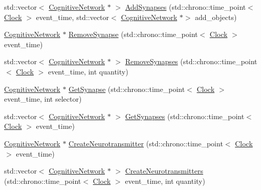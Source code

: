 \begin{DoxyCompactItemize}
\item 
std\+::vector$<$ \mbox{\hyperlink{classCognitiveNetwork}{Cognitive\+Network}} $\ast$ $>$ \mbox{\hyperlink{classCognitiveNetwork_a09d9e01cbd8596af7fac626ce2753643}{Add\+Synapses}} (std\+::chrono\+::time\+\_\+point$<$ \mbox{\hyperlink{universe_8h_a0ef8d951d1ca5ab3cfaf7ab4c7a6fd80}{Clock}} $>$ event\+\_\+time, std\+::vector$<$ \mbox{\hyperlink{classCognitiveNetwork}{Cognitive\+Network}} $\ast$$>$ add\+\_\+objects)
\item 
\mbox{\hyperlink{classCognitiveNetwork}{Cognitive\+Network}} $\ast$ \mbox{\hyperlink{classCognitiveNetwork_a0764ede1c23caa7022a01657a0e3726b}{Remove\+Synapse}} (std\+::chrono\+::time\+\_\+point$<$ \mbox{\hyperlink{universe_8h_a0ef8d951d1ca5ab3cfaf7ab4c7a6fd80}{Clock}} $>$ event\+\_\+time)
\item 
std\+::vector$<$ \mbox{\hyperlink{classCognitiveNetwork}{Cognitive\+Network}} $\ast$ $>$ \mbox{\hyperlink{classCognitiveNetwork_a87d6628f388baed1edb8efda9062c443}{Remove\+Synapses}} (std\+::chrono\+::time\+\_\+point$<$ \mbox{\hyperlink{universe_8h_a0ef8d951d1ca5ab3cfaf7ab4c7a6fd80}{Clock}} $>$ event\+\_\+time, int quantity)
\item 
\mbox{\hyperlink{classCognitiveNetwork}{Cognitive\+Network}} $\ast$ \mbox{\hyperlink{classCognitiveNetwork_a1944aaa13667bc267e6ef44892da969d}{Get\+Synapse}} (std\+::chrono\+::time\+\_\+point$<$ \mbox{\hyperlink{universe_8h_a0ef8d951d1ca5ab3cfaf7ab4c7a6fd80}{Clock}} $>$ event\+\_\+time, int selector)
\item 
std\+::vector$<$ \mbox{\hyperlink{classCognitiveNetwork}{Cognitive\+Network}} $\ast$ $>$ \mbox{\hyperlink{classCognitiveNetwork_aa3376f2e7aed9639c2b5ba27aa6fb314}{Get\+Synapses}} (std\+::chrono\+::time\+\_\+point$<$ \mbox{\hyperlink{universe_8h_a0ef8d951d1ca5ab3cfaf7ab4c7a6fd80}{Clock}} $>$ event\+\_\+time)
\item 
\mbox{\hyperlink{classCognitiveNetwork}{Cognitive\+Network}} $\ast$ \mbox{\hyperlink{classCognitiveNetwork_a53d1047ae3ec721540b64b05abe01559}{Create\+Neurotransmitter}} (std\+::chrono\+::time\+\_\+point$<$ \mbox{\hyperlink{universe_8h_a0ef8d951d1ca5ab3cfaf7ab4c7a6fd80}{Clock}} $>$ event\+\_\+time)
\item 
std\+::vector$<$ \mbox{\hyperlink{classCognitiveNetwork}{Cognitive\+Network}} $\ast$ $>$ \mbox{\hyperlink{classCognitiveNetwork_ad877c495c9efdb582613a5af8d854ac3}{Create\+Neurotransmitters}} (std\+::chrono\+::time\+\_\+point$<$ \mbox{\hyperlink{universe_8h_a0ef8d951d1ca5ab3cfaf7ab4c7a6fd80}{Clock}} $>$ event\+\_\+time, int quantity)
$$
\end{DoxyCompactItemize}
